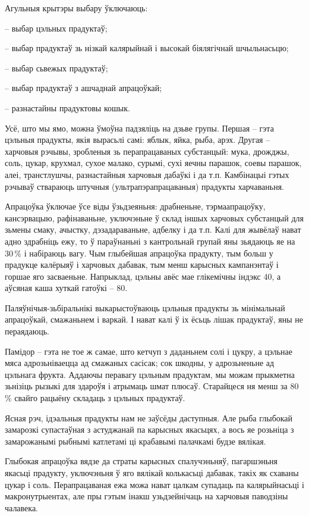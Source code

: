 Агульныя крытэры выбару ўключаюць: 

– выбар цэльных прадуктаў;

– выбар прадуктаў зь нізкай калярыйнай і высокай біялягічнай шчыльнасьцю;

– выбар сьвежых прадуктаў;

– выбар прадуктаў з ашчаднай апрацоўкай;

– разнастайны прадуктовы кошык.

Усё, што мы ямо, можна ўмоўна падзяліць на дзьве групы. Першая – гэта цэльныя прадукты, якія вырасьлі самі: яблык, яйка, рыба, арэх. Другая – харчовыя рэчывы, зробленыя зь перапрацаваных субстанцый: мука, дрожджы, соль, цукар, крухмал, сухое малако, сурымі, сухі яечны парашок, соевы парашок, алеі, транстлушчы, разнастайныя харчовыя дабаўкі і да т.п. Камбінацыі гэтых рэчываў ствараюць штучныя (ультрапэрапрацаваныя) прадукты харчаваньня.

Апрацоўка ўключае ўсе віды ўзьдзеяньня: драбненьне, тэрмаапрацоўку, кансэрвацыю, рафінаваньне, уключэньне ў склад іншых харчовых субстанцый для зьмены смаку, ачыстку, дэзадараваньне, адбелку і да т.п. Калі для жывёлаў нават адно здрабніць ежу, то ў параўнаньні з кантрольнай групай яны зьядаюць яе на 30\,\% і набіраюць вагу. Чым глыбейшая апрацоўка прадукту, тым больш у прадукце калёрыяў і харчовых дабавак, тым менш карысных кампанэнтаў і горшае яго засваеньне. Напрыклад, цэльны авёс мае глікемічны індэкс 40, а аўсяная каша хуткай гатоўкі – 80.

Паляўнічыя-зьбіральнікі выкарыстоўваюць цэльныя прадукты зь мінімальнай апрацоўкай, смажаньнем і варкай. І нават калі ў іх ёсьць лішак прадуктаў, яны не пераядаюць.

Памідор – гэта не тое ж самае, што кетчуп з даданьнем солі і цукру, а цэльнае мяса адрозьніваецца ад смажаных сасісак; сок шкодны, у адрозьненьне ад цэльнага фрукта. Аддаючы перавагу цэльным прадуктам, мы можам прыкметна зьнізіць рызыкі для здароўя і атрымаць шмат плюсаў. Старайцеся ня менш за 80\,\% свайго рацыёну складаць з цэльных прадуктаў.

Ясная рэч, ідэальныя прадукты нам не заўсёды даступныя. Але рыба глыбокай замарозкі супастаўная з астуджанай па карысных якасьцях, а вось яе розьніца з замарожанымі рыбнымі катлетамі ці крабавымі палачкамі будзе вялікая.

Глыбокая апрацоўка вядзе да страты карысных спалучэньняў, пагаршэньня якасьці прадукту, уключэньня ў яго вялікай колькасьці дабавак, такіх як схаваны цукар і соль. Перапрацаваная ежа можа нават цалкам супадаць па калярыйнасьці і макронутрыентах, але пры гэтым інакш узьдзейнічаць на харчовыя паводзіны чалавека.

